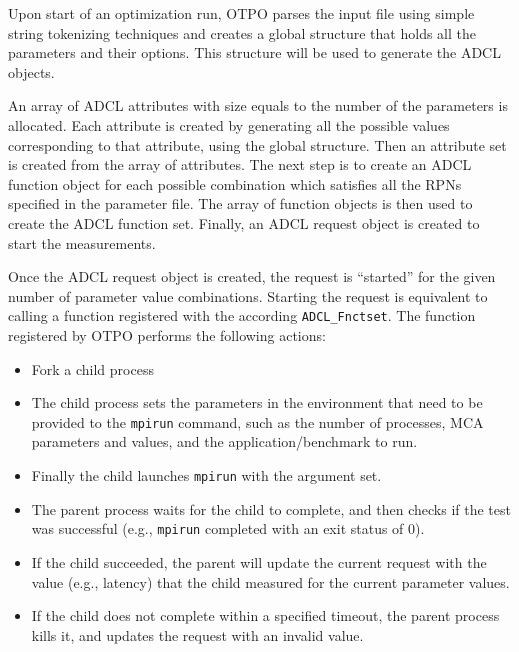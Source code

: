 
Upon start of an optimization run, OTPO parses the input file using simple string tokenizing
techniques and creates a global structure that holds all the
parameters and their options. This structure will be used to generate
the ADCL objects.

An array of ADCL attributes with size equals to the number of the
parameters is allocated. Each attribute is created by generating all
the possible values corresponding to that attribute, using the global
structure. Then an attribute set is created from the array of
attributes. The next step is to create an ADCL function object for
each possible combination which satisfies all the RPNs specified in
the parameter file. The array of function objects is then used to
create the ADCL function set.  Finally, an ADCL request object is
created to start the measurements.

Once the ADCL request object is created, the request is ``started''
for the given number of parameter value combinations.  Starting the
request is equivalent to calling a function registered with the
according {\tt ADCL\_\-Fnctset}. The function registered by OTPO
performs the following actions:
\begin{itemize}
\item Fork a child process
\item The child process sets the parameters in the environment that
  need to be provided to the {\tt mpirun} command, such as the number
  of processes, MCA parameters and values, and the
  application/benchmark to run.
\item Finally the child launches {\tt mpirun} with the argument set.
\item The parent process waits for the child to complete, and then
  checks if the test was successful (e.g., {\tt mpirun} completed with
  an exit status of 0).
\item If the child succeeded, the parent will update the current
  request with the value (e.g., latency) that the child measured for
  the current parameter values.
\item If the child does not complete within a specified timeout, the
  parent process kills it, and updates the request with an invalid
  value.
\end{itemize}

